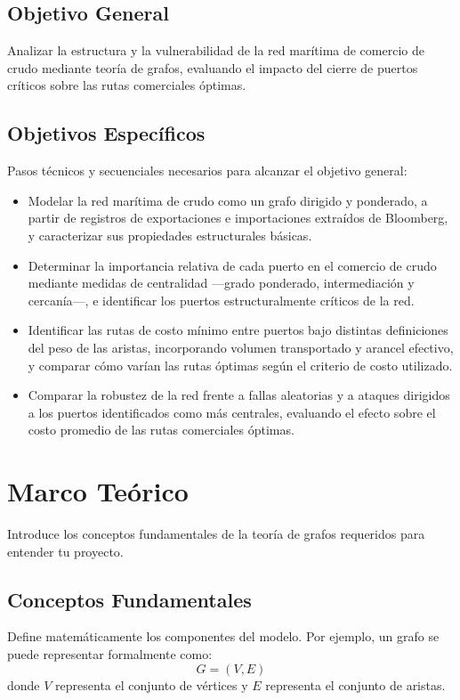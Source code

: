 \documentclass[conference]{IEEEtran}
\begin{document}
\subsection{Objetivo General}
Analizar la estructura y la vulnerabilidad de la red marítima de comercio de crudo mediante teoría de grafos, evaluando el impacto del cierre de puertos críticos sobre las rutas comerciales óptimas.

\subsection{Objetivos Específicos}
Pasos técnicos y secuenciales necesarios para alcanzar el objetivo general:
\begin{itemize}
    \item Modelar la red marítima de crudo como un grafo dirigido y ponderado, a partir de registros de exportaciones e importaciones extraídos de Bloomberg, y caracterizar sus propiedades estructurales básicas.
    \item Determinar la importancia relativa de cada puerto en el comercio de crudo mediante medidas de centralidad —grado ponderado, intermediación y cercanía—, e identificar los puertos estructuralmente críticos de la red.
    \item Identificar las rutas de costo mínimo entre puertos bajo distintas definiciones del peso de las aristas, incorporando volumen transportado y arancel efectivo, y comparar cómo varían las rutas óptimas según el criterio de costo utilizado.
    \item Comparar la robustez de la red frente a fallas aleatorias y a ataques dirigidos a los puertos identificados como más centrales, evaluando el efecto sobre el costo promedio de las rutas comerciales óptimas.
\end{itemize}

\section{Marco Teórico}
Introduce los conceptos fundamentales de la teoría de grafos requeridos para entender tu proyecto.

\subsection{Conceptos Fundamentales}
Define matemáticamente los componentes del modelo. Por ejemplo, un grafo se puede representar formalmente como:
\begin{equation}
G = (V,E)
\end{equation}
donde $V$ representa el conjunto de vértices y $E$ representa el conjunto de aristas.
\end{document}
